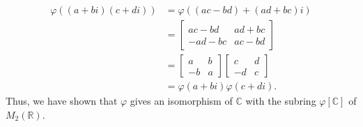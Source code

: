 \documentclass[12pt, oneside]{book}
\newcommand{\R}{\mathbb{R}}
\newcommand{\C}{\mathbb{C}}
\begin{document}
\begin{enumerate}
{\begin{align*}
            \varphi((a + bi)(c + di)) &= \varphi((ac - bd) + (ad + bc)i) \\
            &= \begin{bmatrix}
                ac - bd & ad + bc \\
                -ad - bc & ac - bd
            \end{bmatrix} \\
            &= \begin{bmatrix}
                a & b \\
                -b & a 
            \end{bmatrix} \begin{bmatrix}
                c & d \\
                -d & c
            \end{bmatrix} \\
            &= \varphi(a + bi)\varphi(c + di).
        \end{align*}
        Thus, we have shown that \(\varphi\) gives an isomorphism of \(\C\) with the subring \(\varphi[\C]\) of \(M_{2}(\R)\).
    }

\end{enumerate}

\end{document}
